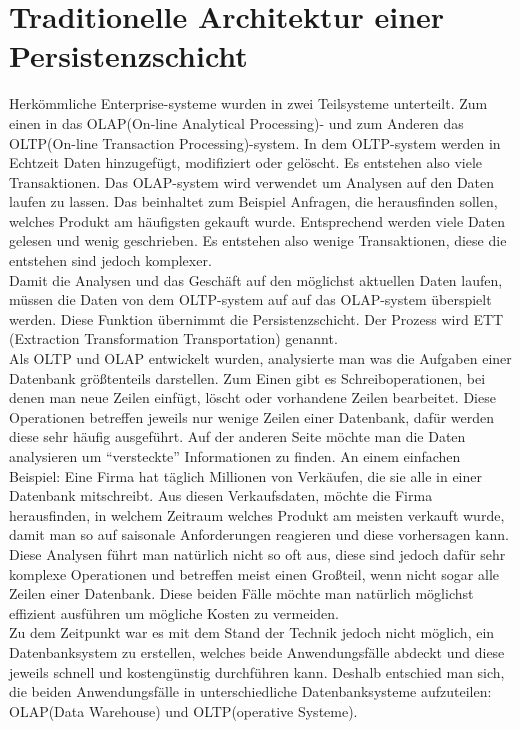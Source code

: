 %
\section{Traditionelle Architektur einer Persistenzschicht}
Herkömmliche Enterprise-systeme wurden in zwei Teilsysteme unterteilt. Zum einen in das OLAP(On-line Analytical Processing)- und zum Anderen das OLTP(On-line Transaction Processing)-system. In dem OLTP-system werden in Echtzeit Daten hinzugefügt, modifiziert oder gelöscht. Es entstehen also viele Transaktionen. Das OLAP-system wird verwendet um Analysen auf den Daten laufen zu lassen. Das beinhaltet zum Beispiel Anfragen, die herausfinden sollen, welches Produkt am häufigsten gekauft wurde. Entsprechend werden viele Daten gelesen und wenig geschrieben. Es entstehen also wenige Transaktionen, diese die entstehen sind jedoch komplexer.
\\
Damit die Analysen und das Geschäft auf den möglichst aktuellen Daten laufen, müssen die Daten von dem OLTP-system auf auf das OLAP-system überspielt werden. Diese Funktion übernimmt die Persistenzschicht. Der Prozess wird ETT (Extraction Transformation Transportation) genannt.
\\
Als OLTP und OLAP entwickelt wurden, analysierte man was die Aufgaben einer Datenbank größtenteils darstellen. Zum Einen gibt es Schreiboperationen, bei denen man neue Zeilen einfügt, löscht oder vorhandene Zeilen bearbeitet. Diese Operationen betreffen jeweils nur wenige Zeilen einer Datenbank, dafür werden diese sehr häufig ausgeführt. Auf der anderen Seite möchte man die Daten analysieren um “versteckte” Informationen zu finden. An einem einfachen Beispiel: Eine Firma hat täglich Millionen von Verkäufen, die sie alle in einer Datenbank mitschreibt. Aus diesen Verkaufsdaten, möchte die Firma herausfinden, in welchem Zeitraum welches Produkt am meisten verkauft wurde, damit man so auf saisonale Anforderungen reagieren und diese vorhersagen kann. Diese Analysen führt man natürlich nicht so oft aus, diese sind jedoch dafür sehr komplexe Operationen und betreffen meist einen Großteil, wenn nicht sogar alle Zeilen einer Datenbank.
Diese beiden Fälle möchte man natürlich möglichst effizient ausführen um mögliche Kosten zu vermeiden.
\\
Zu dem Zeitpunkt war es mit dem Stand der Technik jedoch nicht möglich, ein Datenbanksystem zu erstellen, welches beide Anwendungsfälle abdeckt und diese jeweils schnell und kostengünstig durchführen kann. Deshalb entschied man sich,
die beiden Anwendungsfälle in unterschiedliche Datenbanksysteme aufzuteilen: OLAP(Data Warehouse) und OLTP(operative Systeme).
